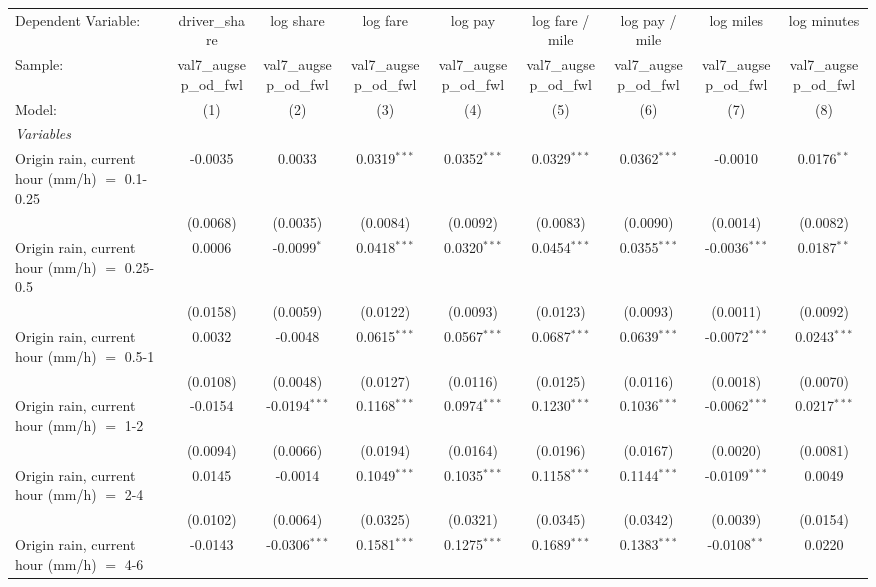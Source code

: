 \ifdefined\ifclassloaded
{}
\fi
\begingroup
\centering
\begin{tabular}{lcccccccc}
   \tabularnewline \midrule \midrule
   Dependent Variable: & driver\_share & log share & log fare & log pay & log fare / mile & log pay / mile & log miles & log minutes\\
   Sample: & val7\_augsep\_od\_fwl & val7\_augsep\_od\_fwl & val7\_augsep\_od\_fwl & val7\_augsep\_od\_fwl & val7\_augsep\_od\_fwl & val7\_augsep\_od\_fwl & val7\_augsep\_od\_fwl & val7\_augsep\_od\_fwl \\
   Model: & (1) & (2) & (3) & (4) & (5) & (6) & (7) & (8)\\
   \midrule
   \emph{Variables}\\
   Origin rain, current hour (mm/h) $=$ 0.1-0.25 & -0.0035 & 0.0033 & 0.0319$^{***}$ & 0.0352$^{***}$ & 0.0329$^{***}$ & 0.0362$^{***}$ & -0.0010 & 0.0176$^{**}$\\
    & (0.0068) & (0.0035) & (0.0084) & (0.0092) & (0.0083) & (0.0090) & (0.0014) & (0.0082)\\
   Origin rain, current hour (mm/h) $=$ 0.25-0.5 & 0.0006 & -0.0099$^{*}$ & 0.0418$^{***}$ & 0.0320$^{***}$ & 0.0454$^{***}$ & 0.0355$^{***}$ & -0.0036$^{***}$ & 0.0187$^{**}$\\
    & (0.0158) & (0.0059) & (0.0122) & (0.0093) & (0.0123) & (0.0093) & (0.0011) & (0.0092)\\
   Origin rain, current hour (mm/h) $=$ 0.5-1 & 0.0032 & -0.0048 & 0.0615$^{***}$ & 0.0567$^{***}$ & 0.0687$^{***}$ & 0.0639$^{***}$ & -0.0072$^{***}$ & 0.0243$^{***}$\\
    & (0.0108) & (0.0048) & (0.0127) & (0.0116) & (0.0125) & (0.0116) & (0.0018) & (0.0070)\\
   Origin rain, current hour (mm/h) $=$ 1-2 & -0.0154 & -0.0194$^{***}$ & 0.1168$^{***}$ & 0.0974$^{***}$ & 0.1230$^{***}$ & 0.1036$^{***}$ & -0.0062$^{***}$ & 0.0217$^{***}$\\
    & (0.0094) & (0.0066) & (0.0194) & (0.0164) & (0.0196) & (0.0167) & (0.0020) & (0.0081)\\
   Origin rain, current hour (mm/h) $=$ 2-4 & 0.0145 & -0.0014 & 0.1049$^{***}$ & 0.1035$^{***}$ & 0.1158$^{***}$ & 0.1144$^{***}$ & -0.0109$^{***}$ & 0.0049\\
    & (0.0102) & (0.0064) & (0.0325) & (0.0321) & (0.0345) & (0.0342) & (0.0039) & (0.0154)\\
   Origin rain, current hour (mm/h) $=$ 4-6 & -0.0143 & -0.0306$^{***}$ & 0.1581$^{***}$ & 0.1275$^{***}$ & 0.1689$^{***}$ & 0.1383$^{***}$ & -0.0108$^{**}$ & 0.0220\\

\end{tabular}
